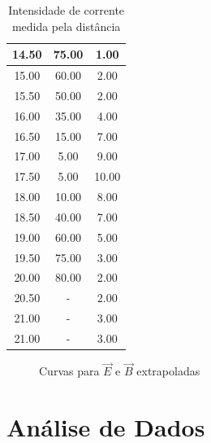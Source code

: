 \documentclass[a4paper,11pt]{article}
\begin{document}
\begin{flushleft}
\begin{table}[!htp]
\begin{tabular}{|c|c|c|}
		 14.50 & 75.00 & 1.00 \\ \hline 
		 15.00 & 60.00 & 2.00 \\ \hline 
		 15.50 & 50.00 & 2.00 \\ \hline 
		 16.00 & 35.00 & 4.00 \\ \hline 
		 16.50 & 15.00 & 7.00 \\ \hline 
		 17.00 & 5.00 & 9.00 \\ \hline 
		 17.50 & 5.00 & 10.00 \\ \hline 
		 18.00 & 10.00 & 8.00 \\ \hline 
		 18.50 & 40.00 & 7.00 \\ \hline 
		 19.00 & 60.00 & 5.00 \\ \hline 
		 19.50 & 75.00 & 3.00 \\ \hline 
		 20.00 & 80.00 & 2.00 \\ \hline 
		 20.50 & - & 2.00 \\ \hline 
		 21.00 & - & 3.00 \\ \hline 
		 21.00 & - & 3.00 \\ \hline 
	\end{tabular}	  
 	\caption{Intensidade de corrente medida pela distância } 
 	\label{tab-E-B-refletido}
 \end{table}
 \end{flushleft}

\FloatBarrier
			\begin{figure}[b]
					\centering
					  
					\caption{}
					\label{graph-E}
			\end{figure}

		
			\begin{figure}[b]		
					\centering
					  
					\caption{}
					\label{graph-B}
			\end{figure}
			

\FloatBarrier

\FloatBarrier
			\begin{figure}[b]		
					\centering
					  
					\caption{Curvas para $\vec{E}$ e $\vec{B}$ extrapoladas }
					\label{graph-B-E-extrapolado}
			\end{figure}
\FloatBarrier


\section{Análise de Dados}
\end{document}
